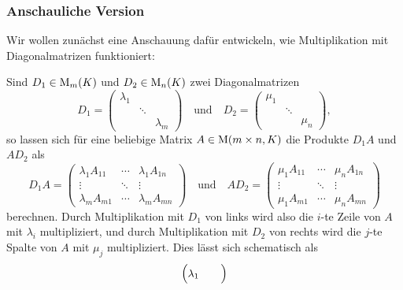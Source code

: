 \subsubsection{Anschauliche Version}

Wir wollen zunächst eine Anschauung dafür entwickeln, wie Multiplikation mit Diagonalmatrizen funktioniert:

\begin{observation}
  \label{observation: multiplication with diagonal matrices}
  Sind $D_1 \in \operatorname{M}_{m}(K)$ und $D_2 \in \operatorname{M}_{n}(K)$ zwei Diagonalmatrizen
  \[
      D_1
    = \begin{pmatrix}
        \lambda_1 &         &           \\
                  & \ddots  &           \\
                  &         & \lambda_m 
      \end{pmatrix}
    \quad\text{und}\quad
      D_2
    = \begin{pmatrix}
        \mu_1 &         &       \\
              & \ddots  &       \\
              &         & \mu_n 
      \end{pmatrix},
  \]
  so lassen sich für eine beliebige Matrix $A \in \operatorname{M}(m \times n, K)$ die Produkte $D_1 A$ und $A D_2$ als
  \[
      D_1 A
    = \begin{pmatrix}
        \lambda_1 A_{11}  & \cdots  & \lambda_1 A_{1n}  \\
        \vdots            & \ddots  & \vdots            \\
        \lambda_m A_{m1}  & \cdots  & \lambda_m A_{mn}
      \end{pmatrix}
    \quad\text{und}\quad
      A D_2
    = \begin{pmatrix}
        \mu_1 A_{11}  & \cdots  & \mu_n A_{1n}  \\
        \vdots        & \ddots  & \vdots        \\
        \mu_1 A_{m1}  & \cdots  & \mu_n A_{mn}
      \end{pmatrix}
  \]
  berechnen.
  Durch Multiplikation mit $D_1$ von links wird also die $i$-te Zeile von $A$ mit $\lambda_i$ multipliziert, und durch Multiplikation mit $D_2$ von rechts wird die $j$-te Spalte von $A$ mit $\mu_j$ multipliziert.
  Dies lässt sich schematisch als
  \begin{align*}
        \renewcommand\arraystretch{1.2}
        \begin{pmatrix}
          \lambda_1 &         &           \\

\end{pmatrix}
\end{align*}
\end{observation}
